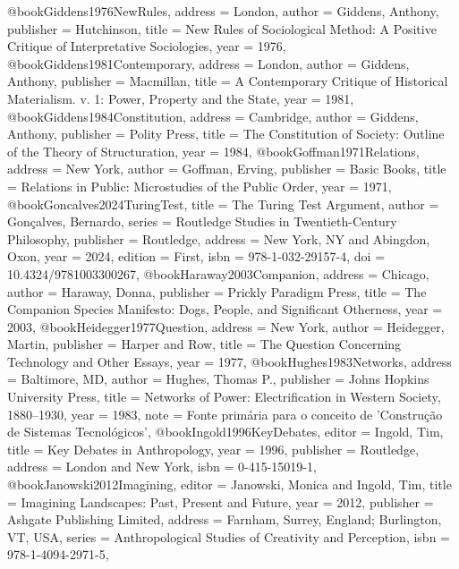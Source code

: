 @book{Giddens1976NewRules,
  address   = {London},
  author    = {Giddens, Anthony},
  publisher = {Hutchinson},
  title     = {{New Rules of Sociological Method: A Positive Critique of Interpretative Sociologies}},
  year      = {1976},
}
@book{Giddens1981Contemporary,
  address   = {London},
  author    = {Giddens, Anthony},
  publisher = {Macmillan},
  title     = {{A Contemporary Critique of Historical Materialism. v. 1: Power, Property and the State}},
  year      = {1981},
}
@book{Giddens1984Constitution,
  address   = {Cambridge},
  author    = {Giddens, Anthony},
  publisher = {Polity Press},
  title     = {{The Constitution of Society: Outline of the Theory of Structuration}},
  year      = {1984},
}
@book{Goffman1971Relations,
  address   = {New York},
  author    = {Goffman, Erving},
  publisher = {Basic Books},
  title     = {{Relations in Public: Microstudies of the Public Order}},
  year      = {1971},
}
@book{Goncalves2024TuringTest,
  title     = {{The Turing Test Argument}},
  author    = {Gonçalves, Bernardo},
  series    = {{Routledge Studies in Twentieth-Century Philosophy}},
  publisher = {Routledge},
  address   = {New York, NY and Abingdon, Oxon},
  year      = {2024},
  edition   = {First},
  isbn      = {978-1-032-29157-4},
  doi       = {10.4324/9781003300267},
}
@book{Haraway2003Companion,
  address   = {Chicago},
  author    = {Haraway, Donna},
  publisher = {Prickly Paradigm Press},
  title     = {{The Companion Species Manifesto: Dogs, People, and Significant Otherness}},
  year      = {2003},
}
@book{Heidegger1977Question,
  address   = {New York},
  author    = {Heidegger, Martin},
  publisher = {Harper and Row},
  title     = {{The Question Concerning Technology and Other Essays}},
  year      = {1977},
}
@book{Hughes1983Networks,
  address   = {Baltimore, MD},
  author    = {Hughes, Thomas P.},
  publisher = {Johns Hopkins University Press},
  title     = {{Networks of Power: Electrification in Western Society, 1880--1930}},
  year      = {1983},
  note      = {Fonte primária para o conceito de 'Construção de Sistemas Tecnológicos'},
}
@book{Ingold1996KeyDebates,
  editor    = {Ingold, Tim},
  title     = {{Key Debates in Anthropology}},
  year      = {1996},
  publisher = {Routledge},
  address   = {London and New York},
  isbn      = {0-415-15019-1},
}
@book{Janowski2012Imagining,
  editor    = {Janowski, Monica and Ingold, Tim},
  title     = {{Imagining Landscapes: Past, Present and Future}},
  year      = {2012},
  publisher = {Ashgate Publishing Limited},
  address   = {Farnham, Surrey, England; Burlington, VT, USA},
  series    = {Anthropological Studies of Creativity and Perception},
  isbn      = {978-1-4094-2971-5},
}
